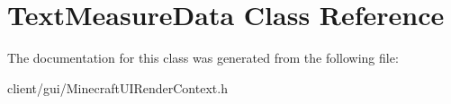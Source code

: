 \hypertarget{class_text_measure_data}{}\section{Text\+Measure\+Data Class Reference}
\label{class_text_measure_data}


The documentation for this class was generated from the following file\+:\begin{DoxyCompactItemize}
\item 
client/gui/Minecraft\+U\+I\+Render\+Context.\+h\end{DoxyCompactItemize}
